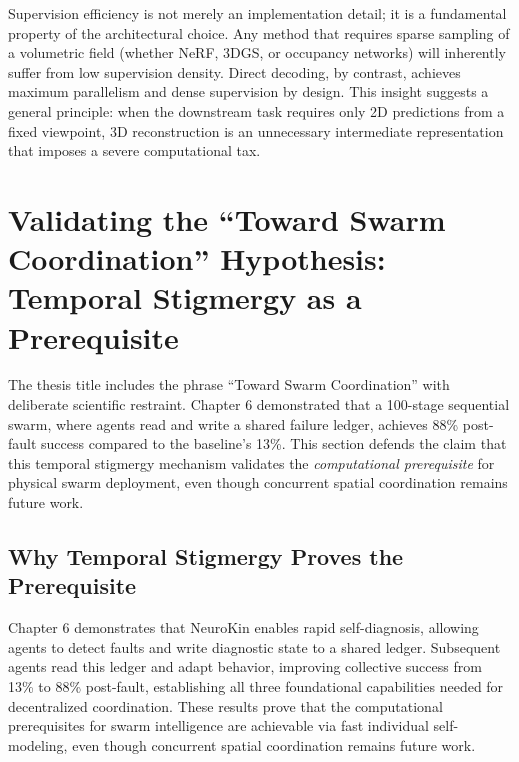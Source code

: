 \documentclass[12pt,a4paper,oneside]{report}
\begin{document}
Supervision efficiency is not merely an implementation detail; it is a fundamental property of the architectural choice. Any method that requires sparse sampling of a volumetric field (whether NeRF, 3DGS, or occupancy networks) will inherently suffer from low supervision density. Direct decoding, by contrast, achieves maximum parallelism and dense supervision by design. This insight suggests a general principle: when the downstream task requires only 2D predictions from a fixed viewpoint, 3D reconstruction is an unnecessary intermediate representation that imposes a severe computational tax.

\section{Validating the ``Toward Swarm Coordination'' Hypothesis: Temporal Stigmergy as a Prerequisite}
\label{sec:validating_swarm_hypothesis}

The thesis title includes the phrase ``Toward Swarm Coordination'' with deliberate scientific restraint. Chapter 6 demonstrated that a 100-stage sequential swarm, where agents read and write a shared failure ledger, achieves 88\% post-fault success compared to the baseline's 13\%. This section defends the claim that this temporal stigmergy mechanism validates the \textit{computational prerequisite} for physical swarm deployment, even though concurrent spatial coordination remains future work.

\subsection{Why Temporal Stigmergy Proves the Prerequisite}
Chapter 6 demonstrates that NeuroKin enables rapid self-diagnosis, allowing agents to detect faults and write diagnostic state to a shared ledger. Subsequent agents read this ledger and adapt behavior, improving collective success from 13\% to 88\% post-fault, establishing all three foundational capabilities needed for decentralized coordination. These results prove that the computational prerequisites for swarm intelligence are achievable via fast individual self-modeling, even though concurrent spatial coordination remains future work.
\end{document}
